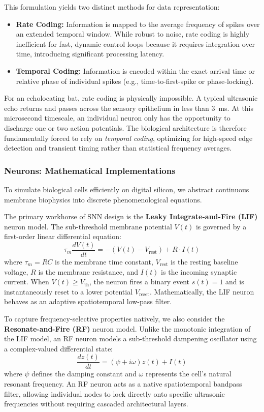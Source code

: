 This formulation yields two distinct methods for data representation:
\begin{itemize}
    \item \textbf{Rate Coding:} Information is mapped to the average frequency of spikes over an extended temporal window. While robust to noise, rate coding is highly inefficient for fast, dynamic control loops because it requires integration over time, introducing significant processing latency.
    \item \textbf{Temporal Coding:} Information is encoded within the exact arrival time or relative phase of individual spikes (e.g., time-to-first-spike or phase-locking). 
\end{itemize}

For an echolocating bat, rate coding is physically impossible. A typical ultrasonic echo returns and passes across the sensory epithelium in less than 3~ms. At this microsecond timescale, an individual neuron only has the opportunity to discharge one or two action potentials. The biological architecture is therefore fundamentally forced to rely on \textit{temporal coding}, optimizing for high-speed edge detection and transient timing rather than statistical frequency averages.

\subsubsection{Neurons: Mathematical Implementations}
To simulate biological cells efficiently on digital silicon, we abstract continuous membrane biophysics into discrete phenomenological equations.

The primary workhorse of SNN design is the \textbf{Leaky Integrate-and-Fire (LIF)} neuron model. The sub-threshold membrane potential $V(t)$ is governed by a first-order linear differential equation:
\begin{equation}
    \tau_m \frac{dV(t)}{dt} = -(V(t) - V_{\text{rest}}) + R \cdot I(t)
  \label{eq:lif}
\end{equation}
where $\tau_m = RC$ is the membrane time constant, $V_{\text{rest}}$ is the resting baseline voltage, $R$ is the membrane resistance, and $I(t)$ is the incoming synaptic current. When $V(t) \ge V_{\text{th}}$, the neuron fires a binary event $s(t)=1$ and is instantaneously reset to a lower potential $V_{\text{reset}}$. Mathematically, the LIF neuron behaves as an adaptive spatiotemporal low-pass filter.

To capture frequency-selective properties natively, we also consider the \textbf{Resonate-and-Fire (RF)} neuron model. Unlike the monotonic integration of the LIF model, an RF neuron models a sub-threshold dampening oscillator using a complex-valued differential state:
\begin{equation}
    \frac{dz(t)}{dt} = (\psi + i\omega)z(t) + I(t)
\end{equation}
where $\psi$ defines the damping constant and $\omega$ represents the cell's natural resonant frequency. An RF neuron acts as a native spatiotemporal bandpass filter, allowing individual nodes to lock directly onto specific ultrasonic frequencies without requiring cascaded architectural layers.

